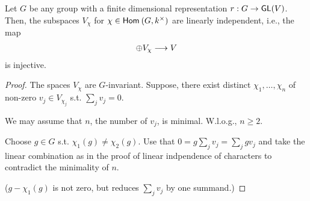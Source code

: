 \begin{lemma}
	Let $G$ be any group with a finite dimensional representation $r : G \overset{}{\rightarrow} \textsf{GL}(V)$. Then, the subspaces $V_\chi$ for $\chi \in \textsf{Hom}_{}\left(G, k^\times\right)$ are linearly independent, i.e., the map
	\begin{align*}
	\oplus V_\chi \overset{}{\longrightarrow} V
	\end{align*}
	is injective.
\end{lemma}
\begin{proof}
	The spaces $V_\chi$ are $G$-invariant. Suppose, there exist distinct $\chi_1, \ldots, \chi_n$ of non-zero $v_j \in V_{\chi_j}$ s.t. $\sum_j v_j = 0$.
	
	We may assume that $n$, the number of $v_j$, is minimal. W.l.o.g., $n \geq 2$.
	
	Choose $g \in G$ s.t. $\chi_1(g) \neq \chi_2(g)$. Use that $0 = g\sum_j v_j = \sum_j gv_j$ and take the linear combination as in the proof of linear indpendence of characters to contradict the minimality of $n$.
	
	($g- \chi_1(g)$ is not zero, but reduces $\sum_j v_j $ by one summand.)
\end{proof}




